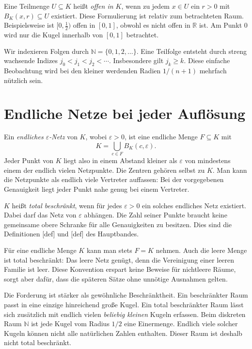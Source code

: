 Eine Teilmenge \(U\subseteq K\) heißt \emph{offen in \(K\)}, wenn zu
jedem \(x\in U\) ein \(r>0\) mit \(B_K(x,r)\subseteq U\) existiert.
Diese Formulierung ist relativ zum betrachteten Raum. Beispielsweise ist
\([0,\tfrac12)\) offen in \([0,1]\), obwohl es nicht offen in
\(\mathbb R\) ist. Am Punkt \(0\) wird nur die Kugel innerhalb von
\([0,1]\) betrachtet.

Wir indexieren Folgen durch \(\mathbb N=\{0,1,2,\ldots\}\). Eine
Teilfolge entsteht durch streng wachsende Indizes
\(j_0<j_1<j_2<\cdots\). Insbesondere gilt \(j_k\geq k\).
Diese einfache Beobachtung wird bei den kleiner werdenden Radien
\(1/(n+1)\) mehrfach nützlich sein.

\section*{Endliche Netze bei jeder Auflösung}

Ein \emph{endliches \(\varepsilon\)-Netz} von \(K\), wobei
\(\varepsilon>0\), ist eine endliche Menge \(F\subseteq K\) mit
\[
 K=\bigcup_{c\in F}B_K(c,\varepsilon).
\]
Jeder Punkt von \(K\) liegt also in einem Abstand kleiner als
\(\varepsilon\) von mindestens einem der endlich vielen Netzpunkte.
Die Zentren gehören selbst zu \(K\). Man kann die Netzpunkte als
endlich viele Vertreter auffassen: Bei der vorgegebenen Genauigkeit
liegt jeder Punkt nahe genug bei einem Vertreter.

\(K\) heißt \emph{total beschränkt}, wenn für jedes
\(\varepsilon>0\) ein solches endliches Netz existiert. Dabei darf
das Netz von \(\varepsilon\) abhängen. Die Zahl seiner Punkte braucht
keine gemeinsame obere Schranke für alle Genauigkeiten zu besitzen.
Dies sind die Definitionen
[def] und
[def] des Hauptbandes.

Für eine endliche Menge \(K\) kann man stets \(F=K\) nehmen.
Auch die leere Menge ist total beschränkt: Das leere Netz genügt, denn
die Vereinigung einer leeren Familie ist leer. Diese Konvention
erspart keine Beweise für nichtleere Räume, sorgt aber dafür, dass die
späteren Sätze ohne unnötige Ausnahmen gelten.

Die Forderung ist stärker als gewöhnliche Beschränktheit. Ein
beschränkter Raum passt in eine einzige hinreichend große Kugel.
Ein total beschränkter Raum lässt sich zusätzlich mit endlich vielen
\emph{beliebig kleinen} Kugeln erfassen. Beim diskreten Raum
\(\mathbb N\) ist jede Kugel vom Radius \(1/2\) eine Einermenge.
Endlich viele solcher Kugeln können nicht alle natürlichen Zahlen
enthalten. Dieser Raum ist deshalb nicht total beschränkt.

